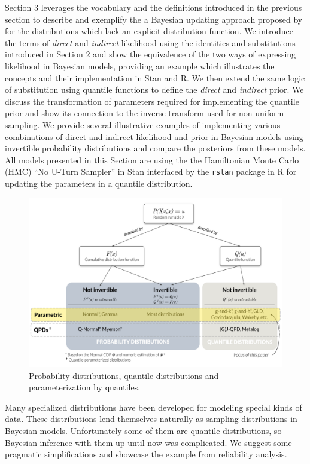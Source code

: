 \documentclass[
  12pt,
]{article}
\begin{document}
Section 3 leverages the vocabulary and the definitions introduced in the previous section to describe and exemplify the a Bayesian updating approach proposed by \citet{nair2020BayesianInferenceQuantile} for the distributions which lack an explicit distribution function. We introduce the terms of \emph{direct} and \emph{indirect} likelihood using the identities and substitutions introduced in Section 2 and show the equivalence of the two ways of expressing likelihood in Bayesian models, providing an example which illustrates the concepts and their implementation in Stan and R. We then extend the same logic of substitution using quantile functions to define the \emph{direct} and \emph{indirect} prior. We discuss the transformation of parameters required for implementing the quantile prior and show its connection to the inverse transform used for non-uniform sampling. We provide several illustrative examples of implementing various combinations of direct and indirect likelihood and prior in Bayesian models using invertible probability distributions and compare the posteriors from these models. All models presented in this Section are using the the Hamiltonian Monte Carlo (HMC) ``No U-Turn Sampler'' in Stan interfaced by the \texttt{rstan} package in R\citep{standevelopmentteam2021RStanInterfaceStan} for updating the parameters in a quantile distribution.

\begin{figure}
\includegraphics[width=6in]{img/QDs} \caption{Probability distributions, quantile distributions and parameterization by quantiles.}\label{fig:qdist-chart}
\end{figure}

Many specialized distributions have been developed for modeling special kinds of data. These distributions lend themselves naturally as sampling distributions in Bayesian models. Unfortunately some of them are quantile distributions, so Bayesian inference with them up until now was complicated. We suggest some pragmatic simplifications and showcase the example from reliability analysis.
\end{document}
